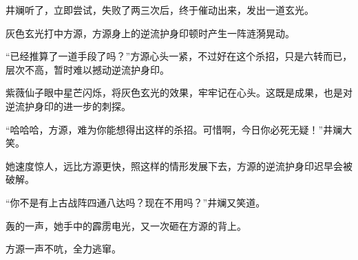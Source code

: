 \begin{this_body}
井斓听了，立即尝试，失败了两三次后，终于催动出来，发出一道玄光。

灰色玄光打中方源，方源身上的逆流护身印顿时产生一阵涟漪晃动。

“已经推算了一道手段了吗？”方源心头一紧，不过好在这个杀招，只是六转而已，层次不高，暂时难以撼动逆流护身印。

紫薇仙子眼中星芒闪烁，将灰色玄光的效果，牢牢记在心头。这既是成果，也是对逆流护身印的进一步的刺探。

“哈哈哈，方源，难为你能想得出这样的杀招。可惜啊，今日你必死无疑！”井斓大笑。

她速度惊人，远比方源更快，照这样的情形发展下去，方源的逆流护身印迟早会被破解。

“你不是有上古战阵四通八达吗？现在不用吗？”井斓又笑道。

轰的一声，她手中的霹雳电光，又一次砸在方源的背上。

方源一声不吭，全力逃窜。

\end{this_body}

